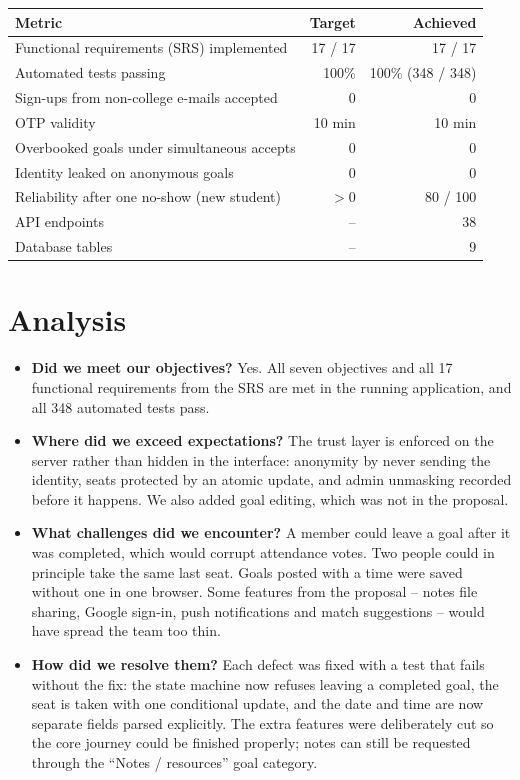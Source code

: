 \documentclass[twoside,12pt]{tietreport}
\begin{document}
\begin{center}\begin{minipage}{\linewidth}\centering
\centering
\small
\begin{tabular}{|l|r|r|}
\hline
\textbf{Metric} & \textbf{Target} & \textbf{Achieved} \\
\hline
Functional requirements (SRS) implemented & 17 / 17 & 17 / 17 \\
Automated tests passing & 100\% & 100\% (348 / 348) \\
Sign-ups from non-college e-mails accepted & 0 & 0 \\
OTP validity & 10 min & 10 min \\
Overbooked goals under simultaneous accepts & 0 & 0 \\
Identity leaked on anonymous goals & 0 & 0 \\
Reliability after one no-show (new student) & $> 0$ & 80 / 100 \\
API endpoints & -- & 38 \\
Database tables & -- & 9 \\
\hline
\end{tabular}
\label{tab:metrics}
\end{minipage}\end{center}

\section{Analysis}
\label{sec:analysis}

\begin{itemize}
  \item \textbf{Did we meet our objectives?} Yes. All seven objectives and all 17
    functional requirements from the SRS are met in the running application, and all 348
    automated tests pass.
  \item \textbf{Where did we exceed expectations?} The trust layer is enforced on
    the server rather than hidden in the interface: anonymity by never sending the
    identity, seats protected by an atomic update, and admin unmasking recorded
    before it happens. We also added goal editing, which was not in the proposal.
  \item \textbf{What challenges did we encounter?} A member could leave a goal
    after it was completed, which would corrupt attendance votes. Two people could
    in principle take the same last seat. Goals posted with a time were saved
    without one in one browser. Some features from the proposal -- notes file
    sharing, Google sign-in, push notifications and match suggestions -- would
    have spread the team too thin.
  \item \textbf{How did we resolve them?} Each defect was fixed with a test that
    fails without the fix: the state machine now refuses leaving a completed goal,
    the seat is taken with one conditional update, and the date and time are now
    separate fields parsed explicitly. The extra features were deliberately cut so
    the core journey could be finished properly; notes can still be requested
    through the ``Notes / resources'' goal category.
\end{itemize}
\end{document}
